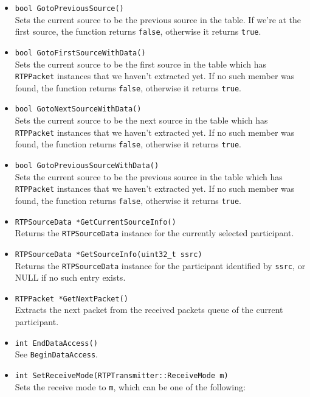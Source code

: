 \documentclass[12pt,a4paper]{article}
\begin{document}
\begin{itemize}
					\item {\tt bool GotoPreviousSource()}\\
						Sets the current source to be the previous source in the table.
						If we're at the first source, the function returns
						{\tt false}, otherwise it returns {\tt true}.
					\item {\tt bool GotoFirstSourceWithData()}\\
						Sets the current source to be the first source in the table
						which has {\tt RTPPacket} instances that we haven't extracted
						yet. If no such member was found, the function returns {\tt false},
						otherwise it returns {\tt true}.
					\item {\tt bool GotoNextSourceWithData()}\\
						Sets the current source to be the next source in the table
						which has {\tt RTPPacket} instances that we haven't extracted
						yet. If no such member was found, the function returns {\tt false},
						otherwise it returns {\tt true}.
					\item {\tt bool GotoPreviousSourceWithData()}\\
						Sets the current source to be the previous source in the table
						which has {\tt RTPPacket} instances that we haven't extracted
						yet. If no such member was found, the function returns {\tt false},
						otherwise it returns {\tt true}.
					\item {\tt RTPSourceData *GetCurrentSourceInfo()}\\
						Returns the {\tt RTPSourceData} instance for the currently
						selected participant.
					\item {\tt RTPSourceData *GetSourceInfo(uint32\_t ssrc)}\\
						Returns the {\tt RTPSourceData} instance for the participant
						identified by {\tt ssrc}, or NULL if no such entry exists.
					\item {\tt RTPPacket *GetNextPacket()}\\
						Extracts the next packet from the received packets queue
						of the current participant.
					\item {\tt int EndDataAccess()}\\
						See {\tt BeginDataAccess}.
					\item {\tt int SetReceiveMode(RTPTransmitter::ReceiveMode m)}\\
						Sets the receive mode to {\tt m}, which can be one of the
						following:
						\begin{itemize}

\end{itemize}
\end{itemize}
\end{document}

